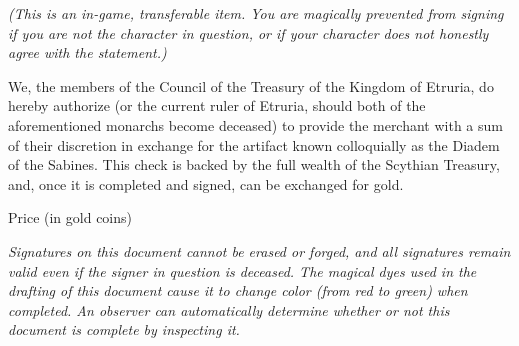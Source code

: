 \documentclass[white]{Kos}
\begin{document}
\name{\wEtruriaCheck{}}

\emph{(This is an in-game, transferable item. You are magically prevented from signing if you are not the character in question, or if your character does not honestly agree with the statement.)}

We, the members of the Council of the Treasury of the Kingdom of Etruria, do hereby authorize \cEtruriaKing{\Monarch} \cEtruriaKing{} (or the current ruler of Etruria, should both of the aforementioned monarchs become deceased) to provide the merchant \cMerchant {} with a sum of their discretion in exchange for the artifact known colloquially as the Diadem of the Sabines. This check is backed by the full wealth of the Scythian Treasury, and, once it is completed and signed, can be exchanged for gold.

\hrulefill

Price (in gold coins)

\hrulefill

\cEtruriaKing{\Monarch} \cEtruriaKing{}

\hrulefill

\cMerchant{}

\emph{Signatures on this document cannot be erased or forged, and all signatures remain valid even if the signer in question is deceased. The magical dyes used in the drafting of this document cause it to change color (from red to green) when completed. An observer can automatically determine whether or not this document is complete by inspecting it.}
\end{document}

